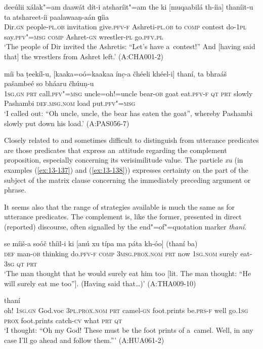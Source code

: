 \begin{exe}
\ex
\label{ex:13-135}
\gll deeúlii xálak"=am daawát dít-i  atsharíit"=am the ki [muqaabilá
  th-íia]  thaníit-u ta atshareet-íi paalawaaṇ-aán ɡíia \\
Dir.\textsc{gn} people-\textsc{pl.ob} invitation give.\textsc{pfv-f}  Ashreti-\textsc{pl.ob} to \textsc{comp} contest do-\textsc{1pl}  say.\textsc{pfv"=msg} \textsc{comp} Ashret-\textsc{gn} wrestler-\textsc{pl} go.\textsc{pfv.pl} \\
\glt `The people of Dir invited the Ashretis: ``Let's have a~contest!'' And [having said that] the wrestlers from Ashret left.' (A:CHA001-2)

\ex
\label{ex:13-136}
\gll míi ba ṭeekíl-u, [kaaka=oó=kaakaa ínc̣-a čhéeli  khéel-i]
thaní, ta bhraáš pašambeé so  bháaru čhúuṇ-u \\
\textsc{1sg.gn} \textsc{prt} call.\textsc{pfv"=msg} uncle=oh!=uncle bear-\textsc{ob} goat  eat.\textsc{pfv-f} \textsc{qt } \textsc{prt} slowly Pashambi \textsc{def.msg.nom} load put.\textsc{pfv"=msg}  \\
\glt `I called out: ``Oh uncle, uncle, the bear has eaten the goat'', whereby Pashambi slowly put down his load.' (A:PAS056-7) 
\end{exe}

 Closely related to and sometimes difficult to distinguish from utterance predicates are those predicates that express an~attitude regarding the complement proposition, especially concerning its verisimilitude value. The particle \textit{xu} (in examples (\ref{ex:13-137}) and (\ref{ex:13-138})) expresses certainty on the part of the subject of the matrix clause concerning the immediately preceding argument or phrase.


It seems also that the range of strategies available is much the same as for utterance predicates. The complement is, like the former, presented in direct (reported) discourse, often signalled by the end"=of"=quotation marker \textit{thaní}. 

\begin{exe}
\ex
\label{ex:13-137}
\gll se míiš-a soóč thíil-i ki [anú xu  típa ma páta kh-óo] (thaní ba) \\
\textsc{def } man-\textsc{ob} thinking do.\textsc{pfv-f} \textsc{comp} \textsc{3msg.prox.nom} \textsc{prt}  now \textsc{1sg.nom} surely eat-\textsc{3sg} \textsc{qt} \textsc{prt} \\
\glt `The man thought that he would surely eat him too [lit. The man thought: ``He will surely eat me too'']. (Having said that{\ldots})' (A:THA009-10)

\ex
\label{ex:13-138}
 thaní \\
oh! \textsc{1sg.gn} God.voc \textsc{3pl.prox.nom} \textsc{prt} camel-\textsc{gn}  foot.prints be.\textsc{prs-f} well go.\textsc{1sg} \textsc{prox} foot.prints catch-\textsc{cv} what \textsc{prt} \textsc{qt } \\
\glt `I thought: ``Oh my God! These must be the foot prints of a~camel. Well, in any case I'll go ahead and follow them.''' (A:HUA061-2) 
\end{exe}

